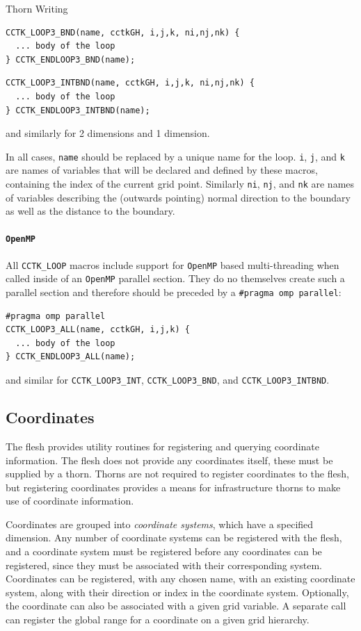 \begin{cactuspart}{Thorn Writing}
\begin{verbatim}
CCTK_LOOP3_BND(name, cctkGH, i,j,k, ni,nj,nk) {
  ... body of the loop
} CCTK_ENDLOOP3_BND(name);
\end{verbatim}

\begin{verbatim}
CCTK_LOOP3_INTBND(name, cctkGH, i,j,k, ni,nj,nk) {
  ... body of the loop
} CCTK_ENDLOOP3_INTBND(name);
\end{verbatim}
and similarly for 2 dimensions and 1 dimension.

In all cases, \texttt{name} should be replaced by a unique name for
the loop. \texttt{i}, \texttt{j}, and \texttt{k} are names of
variables that will be declared and defined by these macros,
containing the index of the current grid point. Similarly \texttt{ni},
\texttt{nj}, and \texttt{nk} are names of variables describing the
(outwards pointing) normal direction to the boundary as well as the
distance to the boundary.

\paragraph{\texttt{OpenMP}} All \texttt{CCTK\_LOOP} macros include support for
\texttt{OpenMP} based multi-threading when called inside of an \texttt{OpenMP}
parallel section. They do no themselves create such a parallel section and
therefore should be preceded by a \texttt{\#pragma omp parallel}:
\begin{verbatim}
#pragma omp parallel
CCTK_LOOP3_ALL(name, cctkGH, i,j,k) {
  ... body of the loop
} CCTK_ENDLOOP3_ALL(name);
\end{verbatim}
and similar for \texttt{CCTK\_LOOP3\_INT}, \texttt{CCTK\_LOOP3\_BND}, and
\texttt{CCTK\_LOOP3\_INTBND}.

\subsection{Coordinates}
\label{sec:CactusAPI.coordinates}

The flesh provides utility routines for registering and querying
coordinate information. The flesh does not provide any coordinates
itself, these must be supplied by a thorn. Thorns are not required to
register coordinates to the flesh, but registering coordinates
provides a means for infrastructure thorns to make use of coordinate
information.

Coordinates are grouped into \textit{coordinate systems}, which have a
specified dimension. Any number of coordinate systems can be
registered with the flesh, and a coordinate system must be registered
before any coordinates can be registered, since they must be
associated with their corresponding system.  Coordinates can be
registered, with any chosen name, with an existing coordinate system,
along with their direction or index in the coordinate system.
Optionally, the coordinate can also be associated with a given grid
variable.  A separate call can register the global range for a
coordinate on a given grid hierarchy.


\end{cactuspart}
